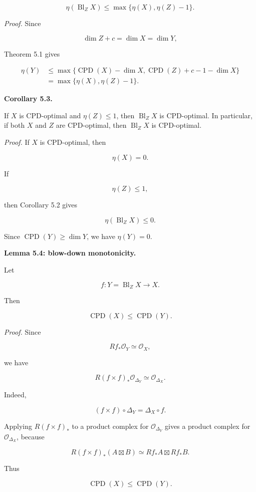 \documentclass[11pt]{amsart}
\theoremstyle{definition}
\begin{document}
\[
\eta(\operatorname{Bl}_ZX)
\le
\max\{\eta(X),\eta(Z)-1\}.
\]

\noindent\emph{Proof.} Since

\[
\dim Z+c=\dim X=\dim Y,
\]

Theorem 5.1 gives

\[
\begin{aligned}
\eta(Y)
&\le
\max\{
\operatorname{CPD}(X)-\dim X,
\operatorname{CPD}(Z)+c-1-\dim X
\}\\
&=
\max\{\eta(X),\eta(Z)-1\}.
\end{aligned}
\]

\noindent\textbf{Corollary 5.3.}

If $X$ is CPD-optimal and $\eta(Z)\le1$, then $\operatorname{Bl}_ZX$ is CPD-optimal. In particular, if both $X$ and $Z$ are CPD-optimal, then $\operatorname{Bl}_ZX$ is CPD-optimal.

\noindent\emph{Proof.} If $X$ is CPD-optimal, then

\[
\eta(X)=0.
\]

If

\[
\eta(Z)\le1,
\]

then Corollary 5.2 gives

\[
\eta(\operatorname{Bl}_ZX)\le0.
\]

Since $\operatorname{CPD}(Y)\ge\dim Y$, we have $\eta(Y)=0$.

\noindent\textbf{Lemma 5.4: blow-down monotonicity.}

Let

\[
f:Y=\operatorname{Bl}_ZX\to X.
\]

Then

\[
\operatorname{CPD}(X)\le\operatorname{CPD}(Y).
\]

\noindent\emph{Proof.} Since

\[
Rf_*\mathcal O_Y\simeq\mathcal O_X,
\]

we have

\[
R(f\times f)_*\mathcal O_{\Delta_Y}
\simeq
\mathcal O_{\Delta_X}.
\]

Indeed,

\[
(f\times f)\circ \Delta_Y=\Delta_X\circ f.
\]

Applying $R(f\times f)_*$ to a product complex for $\mathcal O_{\Delta_Y}$ gives a product complex for $\mathcal O_{\Delta_X}$, because

\[
R(f\times f)_*(A\boxtimes B)
\simeq
Rf_*A\boxtimes Rf_*B.
\]

Thus

\[
\operatorname{CPD}(X)\le\operatorname{CPD}(Y).
\]
\end{document}
